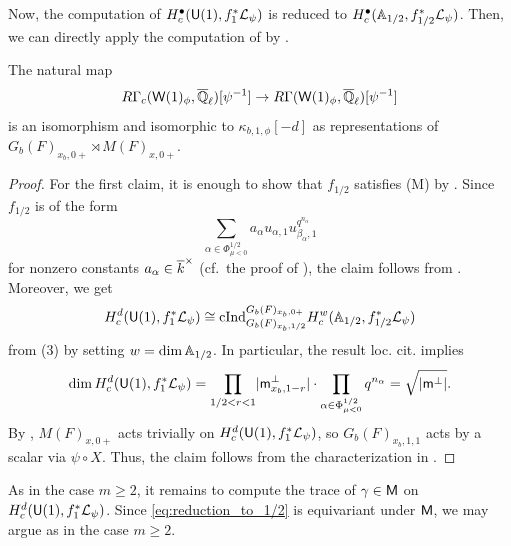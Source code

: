 \documentclass[12pt,reqno]{amsart}
\begin{document}
Now, the computation of $H_c^\bullet({\mathsf{U}}(1), f_1^* {\mathcal{L}}_\psi)$ is reduced to $H_c^\bullet(\mathbb{A}_{1/2}, f_{1/2}^* {\mathcal{L}}_\psi)$. Then, we can directly apply the computation of \cite{Tak26_Yu} by . 

\begin{prop} \label{prop:cohomology_reduction_n=1_partial}
    The natural map 
    \[
        R\Gamma_c({\mathsf{W}}(1)_\phi, {\overline{\mathbb{Q}}_\ell})[\psi^{-1}] \to R\Gamma({\mathsf{W}}(1)_\phi, {\overline{\mathbb{Q}}_\ell})[\psi^{-1}]
    \]
    is an isomorphism and isomorphic to $\kappa_{b, 1, \phi}[-d]$ as representations of $G_b(F)_{x_b, 0+} \rtimes M(F)_{x, 0+}$. 
\end{prop}
\begin{proof}   
    For the first claim, it is enough to show that $f_{1/2}$ satisfies (M) by . Since $f_{1/2}$ is of the form 
    \[
        \sum_{\alpha \in \Phi_{\mu < 0}^{1/2}} a_{\alpha} u_{\alpha, 1} u_{\beta_\alpha, 1}^{q^{n_\alpha}}
    \]
    for nonzero constants $a_\alpha \in {\overline{k}}^\times$ (cf.\ the proof of ), the claim follows from \cite[Theorem 4.1]{Tak26_Yu}. Moreover, we get 
    \begin{equation} \label{eq:reduction_to_1/2}
        H_c^d({\mathsf{U}}(1), f_1^* {\mathcal{L}}_\psi) \cong {\operatorname{cInd}}_{G_b(F)_{x_b, 1/2}}^{G_b(F)_{x_b, 0+}} H_c^w(\mathbb{A}_{1/2}, f_{1/2}^* {\mathcal{L}}_\psi)
    \end{equation}
    from  (3) by setting $w = \dim \mathbb{A}_{1/2}$. In particular, the result loc. cit. implies 
    \[
        \dim H_c^d({\mathsf{U}}(1), f_1^* {\mathcal{L}}_\psi) = \prod_{1/2 < r < 1} \lvert {\mathsf{m}}^\perp_{x_b, 1-r} \rvert \cdot \prod_{\alpha \in \Phi_{\mu < 0}^{1/2}} q^{n_\alpha} = \sqrt{\lvert {\mathsf{m}}^\perp \rvert}. 
    \]
    By , $M(F)_{x, 0+}$ acts trivially on $H_c^d({\mathsf{U}}(1), f_1^* {\mathcal{L}}_\psi)$, so $G_b(F)_{x_b, 1, 1}$ acts by a scalar via $\psi \circ X$. Thus, the claim follows from the characterization in . 
\end{proof}

As in the case $m \geq 2$, it remains to compute the trace of $\gamma \in {\mathsf{M}}$ on $H_c^d({\mathsf{U}}(1), f_1^* {\mathcal{L}}_\psi)$. Since \eqref{eq:reduction_to_1/2} is equivariant under ${\mathsf{M}}$, we may argue as in the case $m \geq 2$. 
\end{document}
